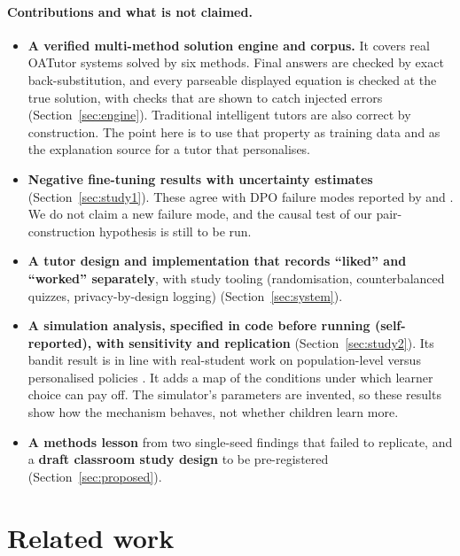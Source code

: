 \documentclass[11pt,a4paper]{article}
\begin{document}
\paragraph{Contributions and what is not claimed.}
\begin{itemize}
  \item \textbf{A verified multi-method solution engine and corpus.} It covers real OATutor
        systems solved by six methods. Final answers are checked by exact back-substitution,
        and every parseable displayed equation is checked at the true solution, with checks
        that are shown to catch injected errors (Section~\ref{sec:engine}). Traditional
        intelligent tutors are also correct by construction. The point here is to use that
        property as training data and as the explanation source for a tutor that
        personalises.
  \item \textbf{Negative fine-tuning results with uncertainty estimates}
        (Section~\ref{sec:study1}). These agree with DPO failure modes reported by
        \citet{pal2024smaug} and \citet{pang2024iterative}. We do not claim a new failure
        mode, and the causal test of our pair-construction hypothesis is still to be run.
  \item \textbf{A tutor design and implementation that records ``liked'' and ``worked''
        separately}, with study tooling (randomisation, counterbalanced quizzes,
        privacy-by-design logging) (Section~\ref{sec:system}).
  \item \textbf{A simulation analysis, specified in code before running (self-reported), with
        sensitivity and replication}
        (Section~\ref{sec:study2}). Its bandit result is in line with real-student work on
        population-level versus personalised policies \citep{schmucker2025learning}. It adds a map of the
        conditions under which learner choice can pay off. The simulator's parameters are
        invented, so these results show how the mechanism behaves, not whether children
        learn more.
  \item \textbf{A methods lesson} from two single-seed findings that failed to replicate,
        and a \textbf{draft classroom study design} to be pre-registered
        (Section~\ref{sec:proposed}).
\end{itemize}

\section{Related work}
\label{sec:related}
\end{document}
